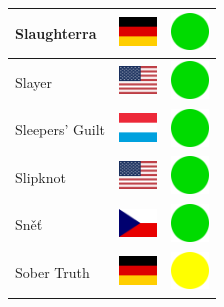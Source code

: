 \documentclass[12pt, a4paper, twoside]{report}
\begin{document}
\begin{center}
\begin{longtable}{|p{5cm}|p{2cm}|p{2cm}|}
Slaughterra & \includegraphics[width=1cm]{4x3/de} & \includegraphics[width=1cm]{likes/y} \\ \hline
Slayer & \includegraphics[width=1cm]{4x3/us} & \includegraphics[width=1cm]{likes/y} \\ \hline
Sleepers' Guilt & \includegraphics[width=1cm]{4x3/lu} & \includegraphics[width=1cm]{likes/y} \\ \hline
Slipknot & \includegraphics[width=1cm]{4x3/us} & \includegraphics[width=1cm]{likes/y} \\ \hline
Sněť & \includegraphics[width=1cm]{4x3/cz} & \includegraphics[width=1cm]{likes/y} \\ \hline
Sober Truth & \includegraphics[width=1cm]{4x3/de} & \includegraphics[width=1cm]{likes/m} \\ \hline

\end{longtable}
\end{center}
\end{document}

